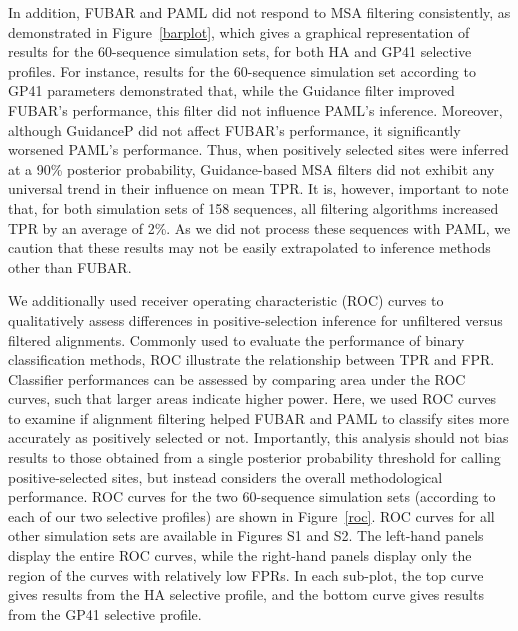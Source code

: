 \documentclass[11pt]{article}
\begin{document}
In addition, FUBAR and PAML did not respond to MSA filtering consistently, as demonstrated in Figure~\ref{barplot}, which gives a graphical representation of results for the 60-sequence simulation sets, for both HA and GP41 selective profiles. For instance, results for the 60-sequence simulation set according to GP41 parameters demonstrated that, while the Guidance filter improved FUBAR's performance, this filter did not influence PAML's inference. Moreover, although GuidanceP did not affect FUBAR's performance, it significantly worsened PAML's performance. Thus, when positively selected sites were inferred at a 90\% posterior probability, Guidance-based MSA filters did not exhibit any universal trend in their influence on mean TPR. It is, however, important to note that, for both simulation sets of 158 sequences, all filtering algorithms increased TPR by an average of 2\%. As we did not process these sequences with PAML, we caution that these results may not be easily extrapolated to inference methods other than FUBAR.

We additionally used receiver operating characteristic (ROC) curves to qualitatively assess differences in positive-selection inference for unfiltered versus filtered alignments. Commonly used to evaluate the performance of binary classification methods, ROC illustrate the relationship between TPR and FPR. Classifier performances can be assessed by comparing area under the ROC curves, such that larger areas indicate higher power. Here, we used ROC curves to examine if alignment filtering helped FUBAR and PAML to classify sites more accurately as positively selected or not. Importantly, this analysis should not bias results to those obtained from a single posterior probability threshold for calling positive-selected sites, but instead considers the overall methodological performance. ROC curves for the two 60-sequence simulation sets (according to each of our two selective profiles) are shown in Figure~\ref{roc}. ROC curves for all other simulation sets are available in Figures S1 and S2. The left-hand panels display the entire ROC curves, while the right-hand panels display only the region of the curves with relatively low FPRs. In each sub-plot, the top curve gives results from the HA selective profile, and the bottom curve gives results from the GP41 selective profile. 
\end{document}
